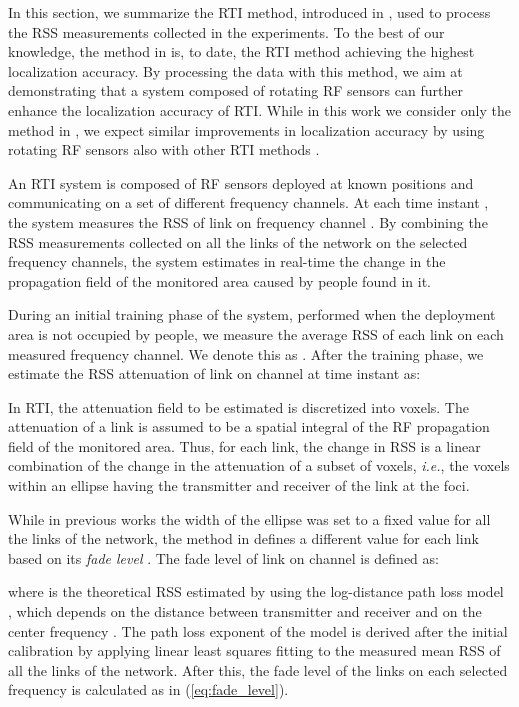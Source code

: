 \documentclass[conference]{IEEEtran}
\begin{document}
In this section, we summarize the RTI method, introduced in \cite{multi_scale_arxiv}, used to process the RSS measurements collected in the experiments. To the best of our knowledge, the method in \cite{multi_scale_arxiv} is, to date, the RTI method achieving the highest localization accuracy. By processing the data with this method, we aim at demonstrating that a system composed of rotating RF sensors can further enhance the localization accuracy of RTI. While in this work we consider only the method in \cite{multi_scale_arxiv}, we expect similar improvements in localization accuracy by using rotating RF sensors also with other RTI methods \cite{Wilson_VRTI_2011,MASS_2012,Zhao_2013}.

An RTI system is composed of  RF sensors deployed at known positions  and communicating on a set  of different frequency channels. At each time instant , the system measures the RSS  of link  on frequency channel . By combining the RSS measurements collected on all the  links of the network on the  selected frequency channels, the system estimates in real-time the change in the propagation field of the monitored area caused by people found in it.

During an initial training phase of the system, performed when the deployment area is not occupied by people, we measure the average RSS of each link on each measured frequency channel. We denote this as . After the training phase, we estimate the RSS attenuation of link  on channel  at time instant  as:

In RTI, the attenuation field to be estimated is discretized into voxels. The attenuation of a link is assumed to be a spatial integral of the RF propagation field of the monitored area. Thus, for each link, the change in RSS is a linear combination of the change in the attenuation of a subset of voxels, \emph{i.e.}, the voxels within an ellipse having the transmitter and receiver of the link at the foci.

While in previous works the width of the ellipse  was set to a fixed value for all the links of the network, the method in \cite{multi_scale_arxiv} defines a different value  for each link based on its \emph{fade level} \cite{Wilson_SkewL_2011}. The fade level of link  on channel  is defined as:

where  is the theoretical RSS estimated by using the log-distance path loss model \cite{Rappaport_book}, which depends on the distance  between transmitter and receiver and on the center frequency . The path loss exponent  of the model is derived after the initial calibration by applying linear least squares fitting to the measured mean RSS of all the links of the network. After this, the fade level of the links on each selected frequency is calculated as in (\ref{eq:fade_level}).
\end{document}
